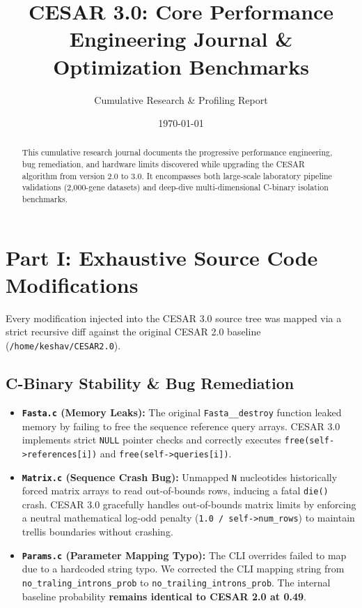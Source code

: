 \documentclass[11pt,a4paper]{article}
\title{\textbf{CESAR 3.0: Core Performance Engineering Journal \& Optimization Benchmarks}}
\author{Cumulative Research \& Profiling Report}
\date{\today}
\begin{document}
\maketitle

\begin{abstract}
This cumulative research journal documents the progressive performance engineering, bug remediation, and hardware limits discovered while upgrading the CESAR algorithm from version 2.0 to 3.0. It encompasses both large-scale laboratory pipeline validations (2,000-gene datasets) and deep-dive multi-dimensional C-binary isolation benchmarks.
\end{abstract}

\section{Part I: Exhaustive Source Code Modifications}
Every modification injected into the CESAR 3.0 source tree was mapped via a strict recursive diff against the original CESAR 2.0 baseline (\texttt{/home/keshav/CESAR2.0}).

\subsection{C-Binary Stability \& Bug Remediation}
\begin{itemize}
    \item \textbf{\texttt{Fasta.c} (Memory Leaks):} The original \texttt{Fasta\_\_destroy} function leaked memory by failing to free the sequence reference query arrays. CESAR 3.0 implements strict \texttt{NULL} pointer checks and correctly executes \texttt{free(self->references[i])} and \texttt{free(self->queries[i])}.
    \item \textbf{\texttt{Matrix.c} (Sequence Crash Bug):} Unmapped \texttt{N} nucleotides historically forced matrix arrays to read out-of-bounds rows, inducing a fatal \texttt{die()} crash. CESAR 3.0 gracefully handles out-of-bounds matrix limits by enforcing a neutral mathematical log-odd penalty (\texttt{1.0 / self->num\_rows}) to maintain trellis boundaries without crashing.
    \item \textbf{\texttt{Params.c} (Parameter Mapping Typo):} The CLI overrides failed to map due to a hardcoded string typo. We corrected the CLI mapping string from \texttt{no\_traling\_introns\_prob} to \texttt{no\_trailing\_introns\_prob}. The internal baseline probability \textbf{remains identical to CESAR 2.0 at 0.49}.
\end{itemize}
\end{document}
